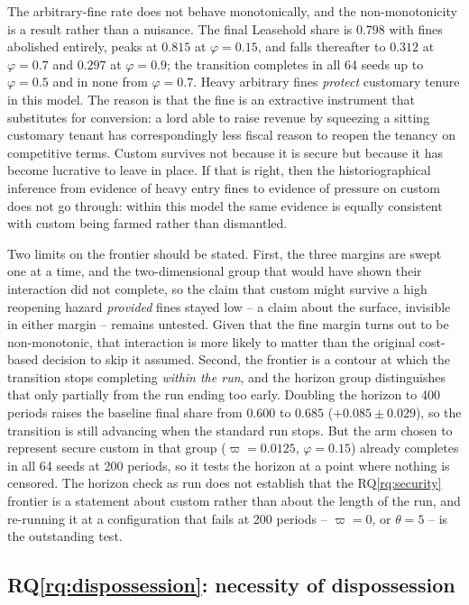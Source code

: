\documentclass[11pt,english]{article}
\begin{document}
The arbitrary-fine rate does not behave monotonically, and the non-monotonicity is a result rather than a nuisance. The final Leasehold share is $0.798$ with fines abolished entirely, peaks at $0.815$ at $\varphi = 0.15$, and falls thereafter to $0.312$ at $\varphi = 0.7$ and $0.297$ at $\varphi = 0.9$; the transition completes in all 64 seeds up to $\varphi = 0.5$ and in none from $\varphi = 0.7$. Heavy arbitrary fines \emph{protect} customary tenure in this model. The reason is that the fine is an extractive instrument that substitutes for conversion: a lord able to raise revenue by squeezing a sitting customary tenant has correspondingly less fiscal reason to reopen the tenancy on competitive terms. Custom survives not because it is secure but because it has become lucrative to leave in place. If that is right, then the historiographical inference from evidence of heavy entry fines to evidence of pressure on custom does not go through: within this model the same evidence is equally consistent with custom being farmed rather than dismantled.

Two limits on the frontier should be stated. First, the three margins are swept one at a time, and the two-dimensional group that would have shown their interaction did not complete, so the claim that custom might survive a high reopening hazard \emph{provided} fines stayed low -- a claim about the surface, invisible in either margin -- remains untested. Given that the fine margin turns out to be non-monotonic, that interaction is more likely to matter than the original cost-based decision to skip it assumed. Second, the frontier is a contour at which the transition stops completing \emph{within the run}, and the horizon group distinguishes that only partially from the run ending too early. Doubling the horizon to 400 periods raises the baseline final share from $0.600$ to $0.685$ ($+0.085 \pm 0.029$), so the transition is still advancing when the standard run stops. But the arm chosen to represent secure custom in that group ($\varpi = 0.0125$, $\varphi = 0.15$) already completes in all 64 seeds at 200 periods, so it tests the horizon at a point where nothing is censored. The horizon check as run does not establish that the RQ\ref{rq:security} frontier is a statement about custom rather than about the length of the run, and re-running it at a configuration that fails at 200 periods -- $\varpi = 0$, or $\theta = 5$ -- is the outstanding test.

\subsection{RQ\ref{rq:dispossession}: necessity of dispossession}
\label{sec:res-rq5}
\end{document}
